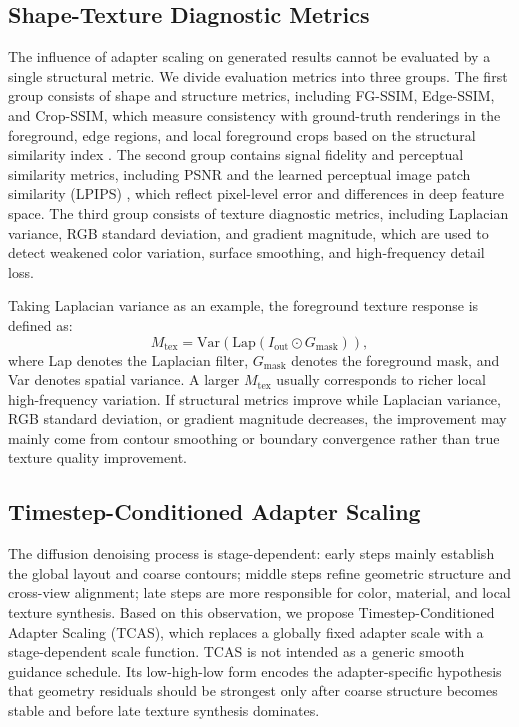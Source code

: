\documentclass[times,twocolumn,final]{elsarticle}
\begin{document}
\subsection{Shape-Texture Diagnostic Metrics}
\label{subsec:metrics}

The influence of adapter scaling on generated results cannot be evaluated by a single structural metric. We divide evaluation metrics into three groups. The first group consists of shape and structure metrics, including FG-SSIM, Edge-SSIM, and Crop-SSIM, which measure consistency with ground-truth renderings in the foreground, edge regions, and local foreground crops based on the structural similarity index \cite{wang2004ssim}. The second group contains signal fidelity and perceptual similarity metrics, including PSNR and the learned perceptual image patch similarity (LPIPS) \cite{zhang2018lpips}, which reflect pixel-level error and differences in deep feature space. The third group consists of texture diagnostic metrics, including Laplacian variance, RGB standard deviation, and gradient magnitude, which are used to detect weakened color variation, surface smoothing, and high-frequency detail loss.

Taking Laplacian variance as an example, the foreground texture response is defined as:
\begin{equation}
M_\text{tex} = \text{Var}(\text{Lap}(I_\text{out} \odot G_\text{mask})),
\end{equation}
where Lap denotes the Laplacian filter, $G_\text{mask}$ denotes the foreground mask, and Var denotes spatial variance. A larger $M_\text{tex}$ usually corresponds to richer local high-frequency variation. If structural metrics improve while Laplacian variance, RGB standard deviation, or gradient magnitude decreases, the improvement may mainly come from contour smoothing or boundary convergence rather than true texture quality improvement.

\subsection{Timestep-Conditioned Adapter Scaling}
\label{subsec:tcas}

The diffusion denoising process is stage-dependent: early steps mainly establish the global layout and coarse contours; middle steps refine geometric structure and cross-view alignment; late steps are more responsible for color, material, and local texture synthesis. Based on this observation, we propose Timestep-Conditioned Adapter Scaling (TCAS), which replaces a globally fixed adapter scale with a stage-dependent scale function. TCAS is not intended as a generic smooth guidance schedule. Its low-high-low form encodes the adapter-specific hypothesis that geometry residuals should be strongest only after coarse structure becomes stable and before late texture synthesis dominates.
\end{document}
